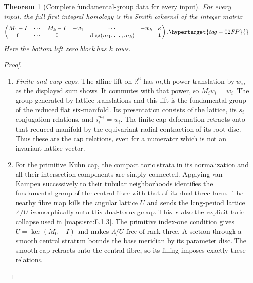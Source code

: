 \documentclass[11pt,a4paper]{article}
\numberwithin{equation}{section}
\newtheorem{theorem}{Theorem}[section]
\theoremstyle{definition}
\begin{document}
\begin{theorem}[Complete fundamental-group data for every input]
For every input, the full first integral homology is the Smith
cokernel of the integer matrix
\begin{equation}
 \begin{pmatrix}
 M_1-I&\cdots&M_k-I&-w_1&\cdots&-w_k&\kappa\\
 0&\cdots&0&&\operatorname{diag}(m_1,\ldots,m_k)&&\boldsymbol1
 \end{pmatrix}.                                           \hypertarget{tag-02FP}{}\label{maps:eq:F.G10}
\end{equation}
Here the bottom left zero block has $k$ rows.

\end{theorem}


\begin{proof}
\begin{enumerate}[label=\arabic*.]
\item \emph{Finite and cusp caps.}
The affine lift on $\mathbb R^6$ has $m_i$th power translation by
$w_i$, as the displayed sum shows.  It commutes with that power,
so $M_iw_i=w_i$.  The group generated by lattice translations
and this lift is the fundamental group of the reduced flat
six-manifold.  Its presentation consists of the lattice, its
$s_i$ conjugation relations, and $s_i^{m_i}=w_i$.
The finite cap deformation retracts onto that reduced manifold
by the equivariant radial contraction of its root disc.
Thus these are the cap relations, even for a numerator
which is not an invariant lattice vector.

\item For the primitive Kuhn cap, the compact toric strata in its
normalization and all their intersection components are simply
connected.  Applying van Kampen successively to their tubular
neighborhoods identifies the fundamental group of the central
fibre with that of its dual three-torus.  The nearby fibre map
kills the angular lattice $U$ and sends the long-period lattice
$\Lambda/U$ isomorphically onto this dual-torus group.  This is
also the explicit toric collapse used in \cref{maps:src:E.1.3}.  The primitive
index-one condition gives $U=\ker(M_0-I)$ and makes $\Lambda/U$
free of rank three.  A section through a smooth central stratum
bounds the base meridian by its parameter disc.  The smooth cap
retracts onto the central fibre, so its filling imposes exactly these relations.


\end{enumerate}
\end{proof}
\end{document}
